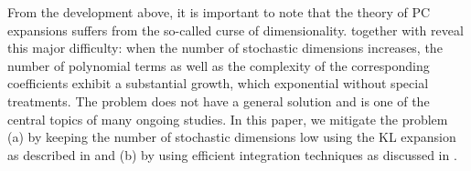 From the development above, it is important to note that the theory of PC expansions suffers from the so-called curse of dimensionality.  together with  reveal this major difficulty: when the number of stochastic dimensions increases, the number of polynomial terms as well as the complexity of the corresponding coefficients exhibit a substantial growth, which exponential without special treatments. The problem does not have a general solution and is one of the central topics of many ongoing studies. In this paper, we mitigate the problem (a) by keeping the number of stochastic dimensions low using the KL expansion as described in  and (b) by using efficient integration techniques as discussed in .
